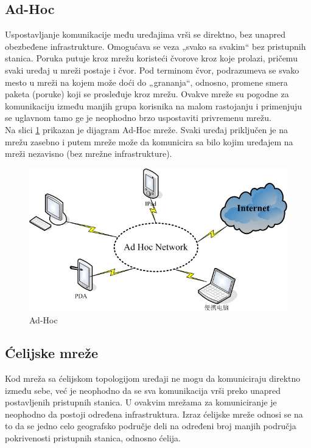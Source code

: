 \documentclass[a4paper]{article}
\begin{document}
    \subsection{Ad-Hoc}
Uspostavljanje komunikacije među uređajima vrši se direktno, bez unapred obezbeđene infrastrukture. Omogućava se veza „svako sa svakim“ bez pristupnih stanica. Poruka putuje kroz mrežu koristeći čvorove kroz koje prolazi, pričemu svaki uređaj u mreži postaje i čvor. Pod terminom čvor, podrazumeva se svako mesto u mreži na kojem može doći do „grananja“, odnosno, promene smera paketa (poruke) koji se prosleđuje kroz mrežu. Ovakve mreže su pogodne za komunikaciju između manjih grupa korisnika na malom rastojanju i primenjuju se uglavnom tamo ge je neophodno brzo uspostaviti privremenu mrežu.\\
Na slici \ref{fig:adhoc} prikazan je dijagram Ad-Hoc mreže. Svaki uređaj priključen je na mrežu zasebno i putem mreže može da komunicira sa bilo kojim uređajem na mreži nezavisno (bez mrežne infrastrukture). 
\newpage

\begin{figure}[ht!]
\begin{center}
\includegraphics[scale=0.35]{AdHoc.png}
\end{center}
\caption{Ad-Hoc \cite{AdHoc}}
\label{fig:adhoc}
\end{figure}



    \subsection{Ćelijske mreže}
 Kod mreža sa ćelijskom topologijom uređaji ne mogu da komuniciraju direktno između sebe, već je neophodno da se sva komunikacija vrši preko unapred postavljenih pristupnih stanica. U ovakvim mrežama za komuniciranje je neophodno da postoji određena infrastruktura. Izraz ćelijske mreže odnosi se na to da se jedno celo geografsko područje deli na određeni broj manjih područja pokrivenosti pristupnih stanica, odnosno ćelija.
\end{document}
